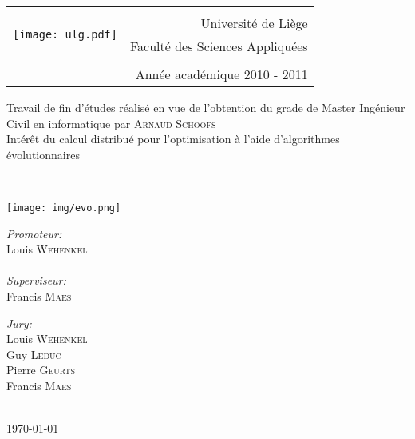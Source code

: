 \documentclass[a4paper, 12pt]{report}
\newcommand{\HRule}{\rule{\linewidth}{0.5mm}}
\begin{document}
\begin{titlepage}

\begin{center}
\begin{tabular}{@{}lr}
\multirow{4}{*}{\texttt{[image: ulg.pdf]}} &    \\  
& Université de Liège  \\
& \hspace{6cm} Faculté des Sciences Appliquées  \\
& \\
& Année académique 2010 - 2011 \\
\hline
\end{tabular} 

\vspace{1.5 cm}

\large Travail de fin d'études réalisé en vue de l'obtention du grade de Master Ingénieur Civil en informatique par \textsc{Arnaud Schoofs}\\[3cm]




\huge Intérêt du calcul distribué pour l'optimisation à l'aide d'algorithmes évolutionnaires
\HRule \\[0.4cm]
\texttt{[image: img/evo.png]}


\vfill


\begin{minipage}{0.4\textwidth}
\begin{flushleft} \large
\emph{Promoteur:}\\
Louis \textsc{Wehenkel}\\
\ \\
\emph{Superviseur:}\\
Francis \textsc{Maes}
\end{flushleft}
\end{minipage}
\begin{minipage}{0.4\textwidth}
\begin{flushright} \large
\emph{Jury:} \\
Louis \textsc{Wehenkel}\\
Guy \textsc{Leduc}\\
Pierre \textsc{Geurts}\\
Francis \textsc{Maes}
\end{flushright}
\end{minipage}

\ \\[1cm]

{\large \today}

\end{center}
\end{titlepage}
\end{document}
